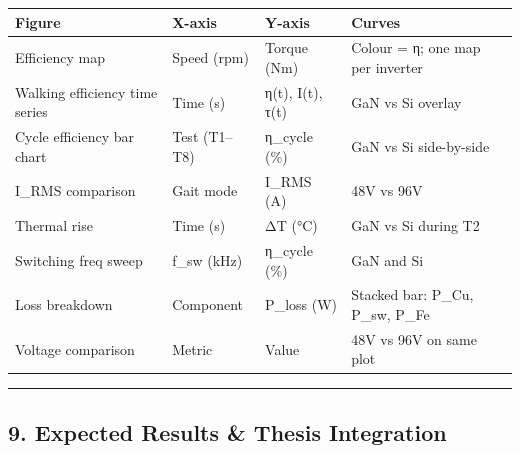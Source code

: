 \documentclass[
]{article}
\newcounter{none} %
\begin{document}
{\def\LTcaptype{none} %
\begin{longtable}[]{@{}
  >{\raggedright\arraybackslash}p{}
  >{\raggedright\arraybackslash}p{}
  >{\raggedright\arraybackslash}p{}
  >{\raggedright\arraybackslash}p{}@{}}
\toprule\noalign{}
\begin{minipage}[b]{\linewidth}\raggedright
Figure
\end{minipage} & \begin{minipage}[b]{\linewidth}\raggedright
X-axis
\end{minipage} & \begin{minipage}[b]{\linewidth}\raggedright
Y-axis
\end{minipage} & \begin{minipage}[b]{\linewidth}\raggedright
Curves
\end{minipage} \\
\midrule\noalign{}
\endhead
\bottomrule\noalign{}
\endlastfoot
Efficiency map & Speed (rpm) & Torque (Nm) & Colour = η; one map per
inverter \\
Walking efficiency time series & Time (s) & η(t), I(t), τ(t) & GaN vs Si
overlay \\
Cycle efficiency bar chart & Test (T1--T8) & η\_cycle (\%) & GaN vs Si
side-by-side \\
I\_RMS comparison & Gait mode & I\_RMS (A) & 48V vs 96V \\
Thermal rise & Time (s) & ΔT (°C) & GaN vs Si during T2 \\
Switching freq sweep & f\_sw (kHz) & η\_cycle (\%) & GaN and Si \\
Loss breakdown & Component & P\_loss (W) & Stacked bar: P\_Cu, P\_sw,
P\_Fe \\
Voltage comparison & Metric & Value & 48V vs 96V on same plot \\
\end{longtable}
}

\begin{center}\rule{0.5\linewidth}{0.5pt}\end{center}

\subsection{9. Expected Results \& Thesis
Integration}\label{expected-results-thesis-integration}
\end{document}
